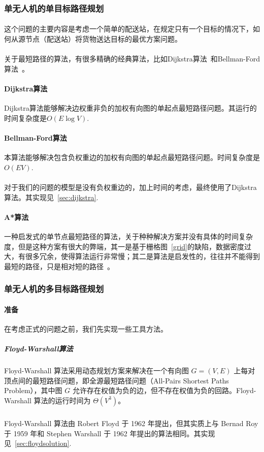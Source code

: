 \documentclass[UTF8,a4paper]{ctexart}
\begin{document}
\subsubsection{单无人机的单目标路径规划}
\paragraph{}这个问题的主要内容是考虑一个简单的配送站，在规定只有一个目标的情况下，如何从源节点（配送站）将货物送达目标的最优方案问题。
\paragraph{}关于最短路径的算法，有很多精确的经典算法，比如Dijkstra算法~\cite{felner2011position}和Bellman-Ford算法~\cite{bellman1958routing}。
\paragraph{Dijkstra算法}Dijkstra算法能够解决边权重非负的加权有向图的单起点最短路径问题。其运行的时间复杂度是$O(E\log{V})$.
\paragraph{Bellman-Ford算法}本算法能够解决包含负权重边的加权有向图的单起点最短路径问题。时间复杂度是$O(EV)$.
\paragraph{}对于我们的问题的模型是没有负权重边的，加上时间的考虑，最终使用了Dijkstra算法。其实现见~\ref{sec:dijkstra}.

\paragraph{A*算法}一种启发式的单节点最短路径的算法，关于种种解决方案并没有具体的时间复杂度，但是这种方案有很大的弊端，其一是基于栅格图~\ref{grid}的缺陷，数据密度过大，有很多冗余，使得算法运行非常慢；其二是算法是启发性的，往往并不能得到最短的路径，只是相对短的路径~\cite{astarredbloggames}。


\subsubsection{单无人机的多目标路径规划}
\paragraph{准备}在考虑正式的问题之前，我们先实现一些工具方法。
\subparagraph{Floyd-Warshall算法}Floyd-Warshall 算法采用动态规划方案来解决在一个有向图 $G = (V, E)$ 上每对顶点间的最短路径问题，即全源最短路径问题（All-Pairs Shortest Paths Problem），其中图 $G$ 允许存在权值为负的边，但不存在权值为负的回路。Floyd-Warshall 算法的运行时间为 $Θ(V^3)$。
\subparagraph{}Floyd-Warshall 算法由 Robert Floyd 于 1962 年提出，但其实质上与 Bernad Roy 于 1959 年和 Stephen Warshall 于 1962 年提出的算法相同。其实现见~\ref{sec:floydsolution}.
\end{document}
